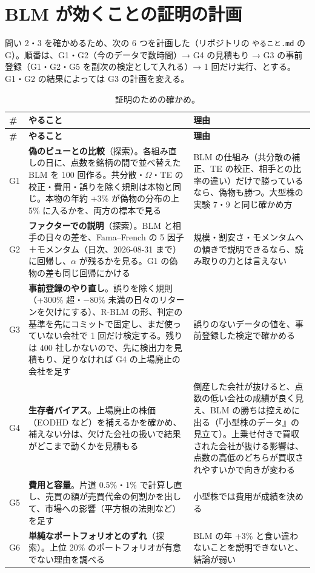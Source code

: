 \documentclass[xelatex,ja=standard,jafont=haranoaji,a4paper,10pt]{bxjsreport}
\newcommand{\code}[1]{\texttt{#1}}
\begin{document}
\chapter{BLM が効くことの証明の計画}\label{ch:plan}

問い 2・3 を確かめるため、次の 6 つを計画した（リポジトリの \code{やること.md} の G）。順番は、G1・G2（今のデータで数時間）→ G4 の見積もり → G3 の事前登録（G1・G2・G5 を副次の検定として入れる）→ 1 回だけ実行、とする。G1・G2 の結果によっては G3 の計画を変える。

\begin{longtable}{p{0.8cm}p{6.4cm}p{6.6cm}}
\caption{証明のための確かめ。}\label{tab:plan}\\
\toprule
\textbf{\#} & \textbf{やること} & \textbf{理由} \\
\midrule
\endfirsthead
\toprule
\textbf{\#} & \textbf{やること} & \textbf{理由} \\
\midrule
\endhead
\bottomrule
\endfoot
G1 & \textbf{偽のビューとの比較}（探索）。各組み直しの日に、点数を銘柄の間で並べ替えた BLM を 100 回作る。共分散・$\Omega$・TE の校正・費用・誤りを除く規則は本物と同じ。本物の年約 +3\% が偽物の分布の上 5\% に入るかを、両方の標本で見る & BLM の仕組み（共分散の補正、TE の校正、相手との比率の違い）だけで勝っているなら、偽物も勝つ。大型株の実験 7・9 と同じ確かめ方 \\
G2 & \textbf{ファクターでの説明}（探索）。BLM と相手の日々の差を、Fama--French の 5 因子＋モメンタム（日次、2026-08-31 まで）に回帰し、$\alpha$ が残るかを見る。G1 の偽物の差も同じ回帰にかける & 規模・割安さ・モメンタムへの傾きで説明できるなら、読み取りの力とは言えない \\
G3 & \textbf{事前登録のやり直し}。誤りを除く規則（+300\% 超・$-80\%$ 未満の日々のリターンを欠けにする）、R-BLM の形、判定の基準を先にコミットで固定し、まだ使っていない会社で 1 回だけ検定する。残りは 400 社しかないので、先に検出力を見積もり、足りなければ G4 の上場廃止の会社を足す & 誤りのないデータの値を、事前登録した検定で確かめる \\
G4 & \textbf{生存者バイアス}。上場廃止の株価（EODHD など）を補えるかを確かめ、補えない分は、欠けた会社の扱いで結果がどこまで動くかを見積もる & 倒産した会社が抜けると、点数の低い会社の成績が良く見え、BLM の勝ちは控えめに出る（『小型株のデータ』の見立て）。上乗せ付きで買収された会社が抜ける影響は、点数の高低のどちらが買収されやすいかで向きが変わる \\
G5 & \textbf{費用と容量}。片道 0.5\%・1\% で計算し直し、売買の額が売買代金の何割かを出して、市場への影響（平方根の法則など）を足す & 小型株では費用が成績を決める \\
G6 & \textbf{単純なポートフォリオとのずれ}（探索）。上位 20\% のポートフォリオが有意でない理由を調べる & BLM の年 +3\% と食い違わないことを説明できないと、結論が弱い \\
\end{longtable}
\end{document}
